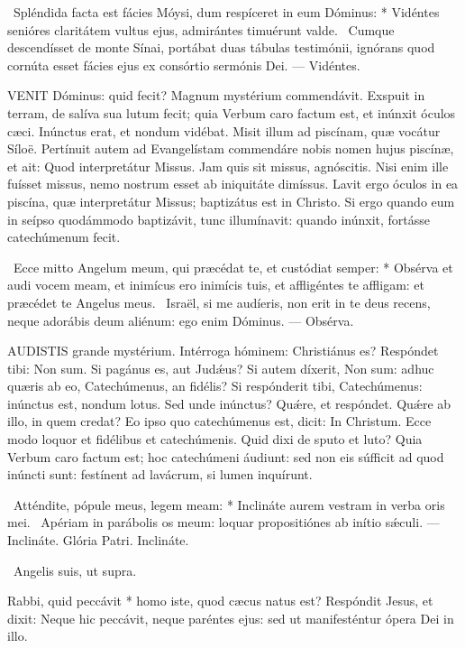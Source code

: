 \R\ Spléndida facta est fácies Móysi, dum respíceret in eum Dóminus: * Vidéntes senióres claritátem vultus ejus, admirántes timuérunt valde. \V\ Cumque descendísset de monte Sínai, portábat duas tábulas testimónii, ignórans quod cornúta esset fácies ejus ex consórtio sermónis Dei. --- Vidéntes.


\lettrine[lines=2]{V}{ENIT} Dóminus: quid fecit? Magnum mystérium commendávit. Exspuit in terram, de salíva sua lutum fecit; quia Verbum caro factum est, et inúnxit óculos cæci. Inúnctus erat, et nondum vidébat. Misit illum ad piscínam, quæ vocátur Síloë. Pertínuit autem ad Evangelístam commendáre nobis nomen hujus piscínæ, et ait: Quod interpretátur Missus. Jam quis sit missus, agnóscitis. Nisi enim ille fuísset missus, nemo nostrum esset ab iniquitáte dimíssus. Lavit ergo óculos in ea piscína, quæ interpretátur Missus; baptizátus est in Christo. Si ergo quando eum in seípso quodámmodo baptizávit, tunc illumínavit: quando inúnxit, fortásse catechúmenum fecit.

\R\ Ecce mitto Angelum meum, qui præcédat te, et custódiat semper: * Obsérva et audi vocem meam, et inimícus ero inimícis tuis, et affligéntes te affligam: et præcédet te Angelus meus. \V\ Israël, si me audíeris, non erit in te deus recens, neque adorábis deum aliénum: ego enim Dóminus. --- Obsérva.


\lettrine[lines=2]{A}{UDISTIS} grande mystérium. Intérroga hóminem: Christiánus es? Respóndet tibi: Non sum. Si pagánus es, aut Judǽus? Si autem díxerit, Non sum: adhuc quæris ab eo, Catechúmenus, an fidélis? Si respónderit tibi, Catechúmenus: inúnctus est, nondum lotus. Sed unde inúnctus? Quǽre, et respóndet. Quǽre ab illo, in quem credat? Eo ipso quo catechúmenus est, dicit: In Christum. Ecce modo loquor et fidélibus et catechúmenis. Quid dixi de sputo et luto? Quia Verbum caro factum est; hoc catechúmeni áudiunt: sed non eis súfficit ad quod inúncti sunt: festínent ad lavácrum, si lumen inquírunt.

\R\ Atténdite, pópule meus, legem meam: * Inclináte aurem vestram in verba oris mei. \V\ Apériam in parábolis os meum: loquar propositiónes ab inítio sǽculi. --- Inclináte. Glória Patri. Inclináte.

\V\ Angelis suis, ut supra.

 Rabbi, quid peccávit * homo iste, quod cæcus natus est? Respóndit Jesus, et dixit: Neque hic peccávit, neque paréntes ejus: sed ut manifesténtur ópera Dei in illo.

